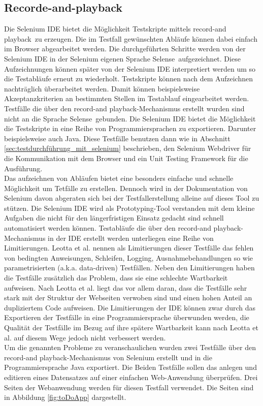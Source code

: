 \subsection{Recorde-and-playback}
\label{sec:recorde_and_playback}
Die Selenium IDE bietet die Möglichkeit Testskripte mittels \grq record-and playback\grq\ zu erzeugen.
Die im Testfall gewünschten Abläufe können dabei einfach im Browser abgearbeitet werden.
Die durchgeführten Schritte werden von der Selenium IDE in der Selenium eigenen Sprache \grq Selense\grq\ aufgezeichnet. Diese Aufzeichnungen können später von der Selenium IDE interpretiert werden um so die Testabläufe erneut zu wiederholt.
Testskripte können nach dem Aufzeichnen nachträglich überarbeitet werden. Damit können beispielsweise Akzeptanzkriterien an bestimmten Stellen im Testablauf eingearbeitet werden.\\
Testfälle die über den \grq record-and playback\grq -Mechanismus erstellt wurden sind nicht an die Sprache \grq Selense\grq\ gebunden. Die Selenium IDE bietet die Möglichkeit die Testskripte in eine Reihe von Programmiersprachen zu exportieren. Darunter beispielsweise auch Java.
Diese Testfälle benutzen dann wie in Abschnitt \ref{sec:testdurchführung_mit_selenium} beschrieben, den Selenium Webdriver für die Kommunikation mit dem Browser und ein Unit Testing Framework für die Ausführung.\\
Das aufzeichnen von Abläufen bietet eine besonders einfache und schnelle Möglichkeit um Tetfälle zu erstellen. Dennoch wird in der Dokumentation von Selenium \cite{selenium_selenium_2015-1} davon abgeraten sich bei der Testfallerstellung alleine auf dieses Tool zu stützen. Die Selenium IDE wird als Prototyping-Tool verstanden mit dem kleine Aufgaben die nicht für den längerfristigen Einsatz gedacht sind schnell automatisiert werden können.
Testabläufe die über den \grq record-and playback\grq -Mechanismus in der IDE erstellt werden unterliegen eine Reihe von Limitierungen. Leotta et al. \cite{leotta_repairing_2013} nennen als Limitierungen dieser Testfälle das fehlen von bedingten Anweisungen, Schleifen, Logging, Ausnahmebehandlungen so wie parametrisierten (a.k.a. data-driven) Testfällen.
Neben den Limitierungen haben die Testfälle zusätzlich das Problem, dass sie eine schlechte Wartbarkeit aufweisen. Nach Leotta et al. \cite{leotta_repairing_2013} liegt das vor allem daran, dass die Testfälle sehr stark mit der Struktur der Webseiten verwoben sind und einen hohen Anteil an dupliziertem Code aufweisen.
Die Limitierungen der IDE können zwar durch das Exportieren der Testfälle in eine Programmiersprache überwunden werden, die Qualität der Testfälle im Bezug auf ihre spätere Wartbarkeit kann nach  Leotta et al. \cite{leotta_repairing_2013} auf diesem Wege jedoch nicht verbessert werden.\\
Um die genannten Probleme zu veranschaulichen wurden zwei Testfälle über den \grq record-and playback\grq -Mechanismus von Selenium erstellt und in die Programmiersprache Java exportiert.
Die Beiden Testfälle sollen das anlegen und editieren eines Datensatzes auf einer einfachen Web-Anwendung überprüfen.
Drei Seiten der Webanwendung werden für diesen Testfall verwendet. Die Seiten sind in Abbildung \ref{fig:toDoApp} dargestellt.

